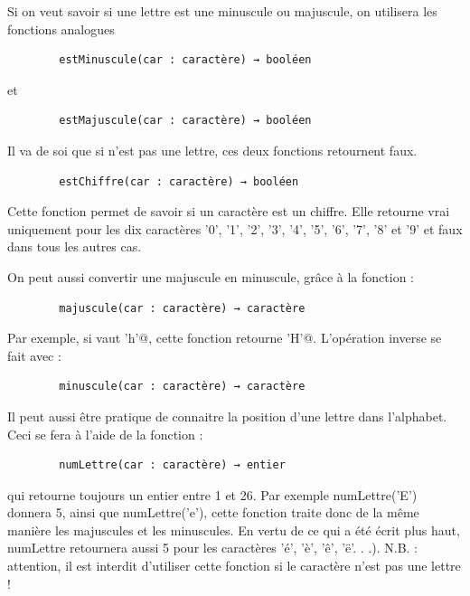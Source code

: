 \documentclass[11pt,a4paper]{article}
\begin{document}
            \par
        
        Si on veut savoir si une lettre est une minuscule ou majuscule, on utilisera les fonctions
        analogues
      
            \par
        \begin{verbatim}
        estMinuscule(car : caractère) → booléen
      \end{verbatim}
        et
      
            \par
        \begin{verbatim}
        estMajuscule(car : caractère) → booléen
      \end{verbatim}
        Il va de soi que si \verb@car@ n'est pas une lettre, ces deux fonctions retournent faux.
      
            \par
        \begin{verbatim}
        estChiffre(car : caractère) → booléen
      \end{verbatim}
        Cette fonction permet de savoir si un caract\`ere est un chiffre. Elle retourne vrai uniquement
        pour les dix caract\`eres '0', '1', '2', '3', '4', '5', '6', '7', '8' et '9' et faux dans tous les autres
        cas.
      
            \par
        
        On peut aussi convertir une majuscule en minuscule, gr\^ace \`a la fonction :
      
            \par
        \begin{verbatim}
        majuscule(car : caractère) → caractère
      \end{verbatim}
        Par exemple, si \verb@car@ vaut \verb@’h’@, 
        cette fonction retourne \verb@’H’@. L'op\'eration inverse se fait avec :
      
            \par
        \begin{verbatim}
        minuscule(car : caractère) → caractère
      \end{verbatim}
        Il peut aussi \^etre pratique de connaitre la position d'une lettre dans l'alphabet. Ceci se fera
        \`a l'aide de la fonction :
      
            \par
        \begin{verbatim}
        numLettre(car : caractère) → entier
      \end{verbatim}
        qui retourne toujours un entier entre 1 et 26. Par exemple numLettre('E') donnera 5, ainsi
        que numLettre('e'), cette fonction traite donc de la m\^eme mani\`ere les majuscules et les
        minuscules. En vertu de ce qui a \'et\'e \'ecrit plus haut, numLettre retournera aussi 5 pour les
        caract\`eres '\'e', '\`e', '\^e', '\"e'. . .). N.B. : attention, il est interdit d'utiliser cette fonction si le
        caract\`ere n'est pas une lettre !
      
\end{document}
